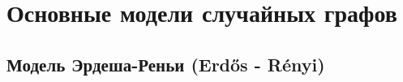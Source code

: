 \documentclass[t]{beamer}
\begin{document}
    
    \frame{\titlepage}
    
    \section{Основные модели случайных графов}
        
        \subsection{Модель Эрдеша-Реньи (Erdős - Rényi)} 
            \subsubsection{}

            \begin{frame}
            
            \end{frame}	
            
            \begin{frame}
                
            \end{frame}	

            \begin{frame}
                
            \end{frame}	
            
            \begin{frame}
                
            \end{frame}	
            
            \begin{frame}
                
            \end{frame}	

            \begin{frame}
                
            \end{frame}	

            \begin{frame}
                
            \end{frame}	
        
\end{document}
